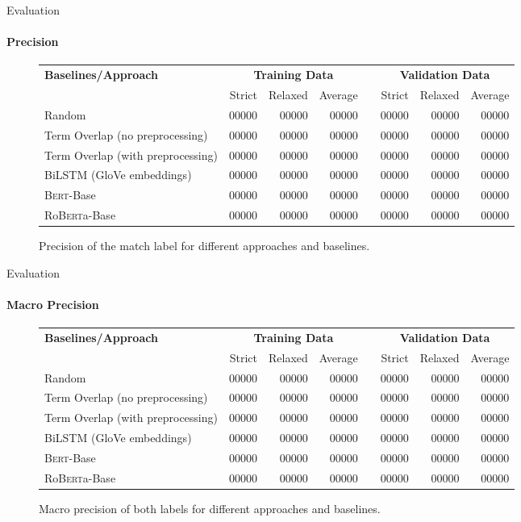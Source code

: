 \documentclass[english,handout]{mlutalk}
\newcommand{\Bert}{\textsc{Bert}\xspace}
\newcommand{\BertBase}{\Bert-Base\xspace}
\newcommand{\Roberta}{\mbox{Ro\textsc{Bert}a}\xspace}
\newcommand{\RobertaBase}{\Roberta-Base\xspace}
\begin{document}
\begin{frame}{Evaluation}
  \framesubtitle{Precision}
  \begin{figure}
    \centering
    \caption{Precision of the match label for different approaches and baselines.}
    \tiny
    \begin{tabular}{lrrrlrrr}
      \toprule
      \textbf{Baselines/Approach} & \multicolumn{3}{c}{\textbf{Training Data}} & & \multicolumn{3}{c}{\textbf{Validation Data}}\\ \cmidrule{2-4} \cmidrule{6-8}
        & Strict & Relaxed & Average & & Strict & Relaxed & Average\\
      \midrule
      Random 
      & 00000 & 00000 & 00000 & & 00000 & 00000 & 00000 \\
      Term Overlap (no preprocessing)
      & 00000 & 00000 & 00000 & & 00000 & 00000 & 00000 \\
      Term Overlap (with preprocessing)
      & 00000 & 00000 & 00000 & & 00000 & 00000 & 00000 \\
      \midrule
      BiLSTM (GloVe embeddings)
      & 00000 & 00000 & 00000 & & 00000 & 00000 & 00000 \\
      \BertBase
      & 00000 & 00000 & 00000 & & 00000 & 00000 & 00000 \\
      \RobertaBase
      & 00000 & 00000 & 00000 & & 00000 & 00000 & 00000 \\
      \bottomrule
    \end{tabular}
  \end{figure}
\end{frame}

\begin{frame}{Evaluation}
  \framesubtitle{Macro Precision}
  \begin{figure}
    \centering
    \caption{Macro precision of both labels for different approaches and baselines.}
    \tiny
    \begin{tabular}{lrrrlrrr}
      \toprule
      \textbf{Baselines/Approach} & \multicolumn{3}{c}{\textbf{Training Data}} & & \multicolumn{3}{c}{\textbf{Validation Data}}\\ \cmidrule{2-4} \cmidrule{6-8}
        & Strict & Relaxed & Average & & Strict & Relaxed & Average\\
      \midrule
      Random 
      & 00000 & 00000 & 00000 & & 00000 & 00000 & 00000 \\
      Term Overlap (no preprocessing)
      & 00000 & 00000 & 00000 & & 00000 & 00000 & 00000 \\
      Term Overlap (with preprocessing)
      & 00000 & 00000 & 00000 & & 00000 & 00000 & 00000 \\
      \midrule
      BiLSTM (GloVe embeddings)
      & 00000 & 00000 & 00000 & & 00000 & 00000 & 00000 \\
      \BertBase
      & 00000 & 00000 & 00000 & & 00000 & 00000 & 00000 \\
      \RobertaBase
      & 00000 & 00000 & 00000 & & 00000 & 00000 & 00000 \\
      \bottomrule
    \end{tabular}
  \end{figure}
\end{frame}
\end{document}
